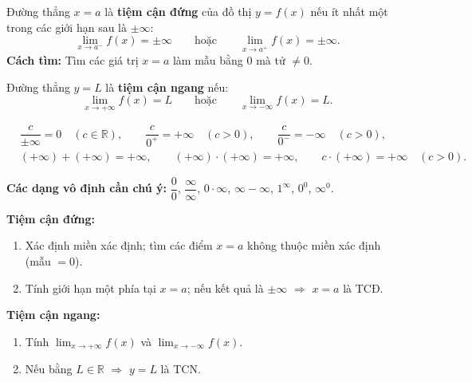 \documentclass[12pt,a4paper]{article}
\begin{document}
\begin{dinhnghia}[title={Tiệm cận đứng (Vertical Asymptote)}]
  Đường thẳng $x = a$ là \textbf{tiệm cận đứng} của đồ thị $y = f(x)$ nếu ít nhất một trong các giới hạn sau là $\pm\infty$:
  \[
    \lim_{x \to a^-} f(x) = \pm\infty \qquad \text{hoặc} \qquad \lim_{x \to a^+} f(x) = \pm\infty.
  \]
  \textbf{Cách tìm:} Tìm các giá trị $x = a$ làm mẫu bằng $0$ mà tử $\ne 0$.
\end{dinhnghia}

\begin{dinhnghia}[title={Tiệm cận ngang (Horizontal Asymptote)}]
  Đường thẳng $y = L$ là \textbf{tiệm cận ngang} nếu:
  \[
    \lim_{x \to +\infty} f(x) = L \qquad \text{hoặc} \qquad \lim_{x \to -\infty} f(x) = L.
  \]
\end{dinhnghia}

\begin{congthuc}[title={Các quy tắc tính toán với vô cực}]
  \begin{align*}
    &\dfrac{c}{\pm\infty} = 0 \quad (c \in \mathbb{R}), \qquad
    \dfrac{c}{0^+} = +\infty \quad (c > 0), \qquad
    \dfrac{c}{0^-} = -\infty \quad (c > 0), \\[4pt]
    &(+\infty) + (+\infty) = +\infty, \qquad
    (+\infty) \cdot (+\infty) = +\infty, \qquad
    c \cdot (+\infty) = +\infty \quad (c > 0).
  \end{align*}

  \textbf{Các dạng vô định cần chú ý:} $\dfrac{0}{0}$, $\dfrac{\infty}{\infty}$, $0 \cdot \infty$, $\infty - \infty$, $1^\infty$, $0^0$, $\infty^0$.
\end{congthuc}

\begin{phuongphap}[title={Tìm tiệm cận đứng và ngang}]
  \textbf{Tiệm cận đứng:}
  \begin{enumerate}
    \item Xác định miền xác định; tìm các điểm $x = a$ không thuộc miền xác định (mẫu $= 0$).
    \item Tính giới hạn một phía tại $x = a$; nếu kết quả là $\pm\infty$ $\Rightarrow$ $x = a$ là TCĐ.
  \end{enumerate}
  \textbf{Tiệm cận ngang:}
  \begin{enumerate}
    \item Tính $\displaystyle\lim_{x \to +\infty} f(x)$ và $\displaystyle\lim_{x \to -\infty} f(x)$.
    \item Nếu bằng $L \in \mathbb{R}$ $\Rightarrow$ $y = L$ là TCN.
  \end{enumerate}
\end{phuongphap}
\end{document}
